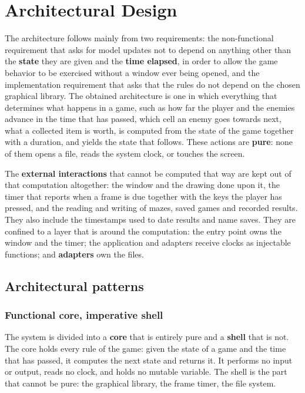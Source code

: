 \chapter{Architectural Design}

The architecture follows mainly from two requirements: the non-functional requirement that asks for model updates not
to depend on anything other than the \textbf{state} they are given and the \textbf{time elapsed}, in order to allow the game behavior
to be exercised without a window ever being opened, and the implementation requirement that asks that the rules do
not depend on the chosen graphical library. The obtained architecture is one in which everything that determines what
happens in a game, such as how far the player and the enemies advance in the time that has passed, which cell an enemy
goes towards next, what a collected item is worth, is computed from the state of the game together with a duration,
and yields the state that follows. These actions are \textbf{pure}: none of them opens a file, reads the system clock, or
touches the screen.

The \textbf{external interactions} that cannot be computed that way are kept out of that computation altogether: the window and the
drawing done upon it, the timer that reports when a frame is due together with the keys the player has pressed, and
the reading and writing of mazes, saved games and recorded results. They also include the timestamps used to date
results and name saves. They are confined to a layer that is around the computation: the entry point owns the window
and the timer; the application and adapters receive clocks as injectable functions; and \textbf{adapters} own the files.

\section{Architectural patterns}

\subsection{Functional core, imperative shell}

The system is divided into a \textbf{core} that is entirely pure and a \textbf{shell} that is not. The core holds
every rule of the game: given the state of a game and the time that has passed, it computes the next state and
returns it. It performs no input or output, reads no clock, and holds no mutable variable. The shell is the part
that cannot be pure: the graphical library, the frame timer, the file system.

